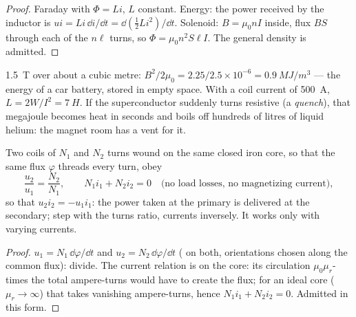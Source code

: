 \begin{proof}
Faraday with $\Phi = Li$, $L$ constant. Energy: the power received by
the inductor is $ui = Li\,\dd i/\dd t = \dd(\tfrac12Li^2)/\dd t$. Solenoid:
$B = \mu_0nI$ inside, flux $BS$ through each of the $n\ell$ turns, so $\Phi =
\mu_0n^2S\ell I$. The general density is admitted.
\end{proof}

\begin{example}\label{ex:b1:induction:mri}
\qty{1.5}{T} over about a cubic metre: $B^2/2\mu_0 = 2.25/2.5 \times 10^{-6} =
\qty{0.9}{MJ/m^3}$ --- the energy of a car battery, stored in empty space.
With a coil current of \qty{500}{A}, $L = 2W/I^2 = \qty{7}{H}$. If the
superconductor suddenly turns resistive (a \emph{quench}), that megajoule
becomes heat in seconds and boils off hundreds of litres of liquid
helium: the magnet room has a vent for it.
\end{example}

\begin{proposition}\label{prop:b1:induction:transformer}
Two coils of $N_1$ and $N_2$ turns wound on the same closed iron core,
so that the same flux $\varphi$ threads every turn, obey
\[
\frac{u_2}{u_1} = \frac{N_2}{N_1} , \qquad N_1i_1 + N_2i_2 = 0 \quad\text{(no load losses, no magnetizing current)},
\]
so that $u_2i_2 = -u_1i_1$: the power taken at the primary is delivered
at the secondary;  step with the turns ratio, currents
inversely. It works only with varying currents.
\end{proposition}

\begin{proof}
$u_1 = N_1\,\dd\varphi/\dd t$ and $u_2 = N_2\,\dd\varphi/\dd t$ ( on both, orientations chosen along the common flux): divide.
The current relation is  on the core: its circulation
$\mu_0\mu_r$-times the total ampere-turns would have to create the
flux; for an ideal core ($\mu_r \to \infty$) that takes vanishing
ampere-turns, hence $N_1i_1 + N_2i_2 = 0$. Admitted in this form.
\end{proof}

